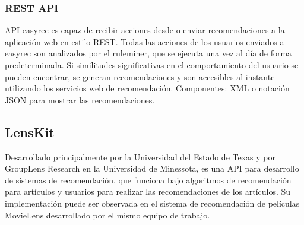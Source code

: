   \subsubsection{REST API}
    API easyrec es capaz de recibir acciones desde o enviar recomendaciones a la aplicación web en estilo REST. Todas las acciones de los usuarios enviados a easyrec son analizados por el ruleminer, que se ejecuta una vez al día de forma predeterminada. Si similitudes significativas en el comportamiento del usuario se pueden encontrar, se generan recomendaciones y son accesibles al instante utilizando los servicios web de recomendación. Componentes: XML o notación JSON para mostrar las recomendaciones. \cite{8}

  \subsection{LensKit}
    Desarrollado principalmente por la Universidad del Estado de Texas y por GroupLens Research en la Universidad de Minessota, es una API para desarrollo de sistemas de recomendación, que funciona bajo algoritmos de recomendación para artículos y usuarios para realizar las recomendaciones de los artículos. Su implementación puede ser observada en el sistema de recomendación de películas MovieLens desarrollado por el mismo equipo de trabajo. \cite{11}
    
